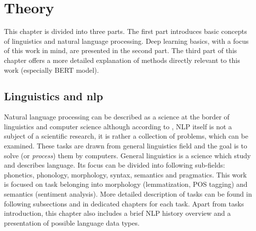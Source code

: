 \chapter{Theory}
\label{chap:theandme}
This chapter is divided into three parts. The first part introduces basic concepts of linguistics and natural language processing. Deep learning basics, with a focus of this work in mind, are presented in the second part. The third part of this chapter offers a more detailed explanation of methods directly relevant to this work (especially BERT model).

\section{Linguistics and \gls{nlp}}


Natural language processing can be described as a science at the border of linguistics and computer science although according to \citep{Wilks}, NLP itself is not a subject of a scientific research, it is rather a collection of problems, which can be examined. These tasks are drawn from general linguistics field and the goal is to solve (or \textit{process}) them by computers. General linguistics is a science which study and describes language. Its focus can be divided into following sub-fields: phonetics, phonology, morphology, syntax, semantics and pragmatics. 
This work is focused on task belonging into morphology (lemmatization, POS tagging) and semantics (sentiment analysis). More detailed description of tasks can be found in following subsections and in dedicated chapters for each task. Apart from tasks introduction, this chapter also includes a brief NLP history overview and a presentation of possible language data types.   %




